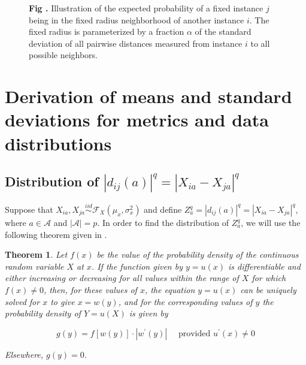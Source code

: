 \documentclass[10pt,letterpaper]{article}\usepackage[]{graphicx}\usepackage[]{color}
\newtheorem{theorem}{Theorem}[section]
\begin{document}
\begin{figure}[ht!]
\centering
\begin{minipage}[h]{0.7\textwidth}
\end{minipage}%
\begin{minipage}[h]{0.3\textwidth}
\noindent{}\textbf{Fig \thefigure \label{fig:gaussPlot}.} Illustration of the expected probability of a fixed instance $j$ being in the fixed radius neighborhood of another instance $i$. The fixed radius is parameterized by a fraction $\alpha$ of the standard deviation of all pairwise distances measured from instance $i$ to all possible neighbors.
\end{minipage}
\end{figure} 

\section{Derivation of means and standard deviations for metrics and data distributions}

\subsection{Distribution of \texorpdfstring{$|d_{ij}(a)|^q = |X_{ia} - X_{ja}|^q$}{}}

Suppose that $X_{ia}, X_{ja} \overset{iid}{\sim} \mathcal{F}_X(\mu_x,\sigma^2_x)$ and define $Z^q_a = |d_{ij}(a)|^q = |X_{ia} - X_{ja}|^q$, where $a \in \mathcal{A}$ and $|\mathcal{A}| = p$. In order to find the distribution of $Z^q_a$, we will use the following theorem given in \cite{freund2004}.

\begin{theorem}\label{thm:freund}
Let $f(x)$ be the value of the probability density of the continuous random variable $X$ at $x$. If the function given by $y = u(x)$ is differentiable and either increasing or decreasing for all values within the range of $X$ for which $f(x) \neq 0$, then, for these values of $x$, the equation $y = u(x)$ can be uniquely solved for $x$ to give $x = w(y)$, and for the corresponding values of $y$ the probability density of $Y = u(X)$ is given by

\[g(y) = f[w(y)] \cdot |w^\prime(y)| \quad \text{ provided } u^\prime(x) \neq 0\]

\noindent Elsewhere, $g(y) = 0$.
\end{theorem}
\end{document}
